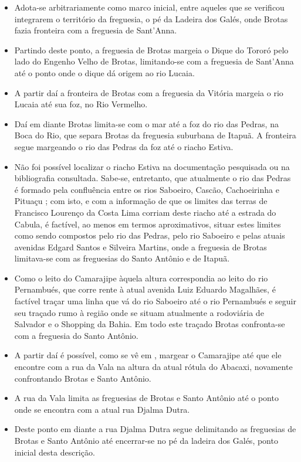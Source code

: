 \begin{itemize}
\item Adota-se arbitrariamente como marco inicial, entre aqueles que se verificou integrarem o território da freguesia, o pé da Ladeira dos Galés, onde Brotas fazia fronteira com a freguesia de Sant'Anna.
\item Partindo deste ponto, a freguesia de Brotas margeia o Dique do Tororó pelo lado do Engenho Velho de Brotas, limitando-se com a freguesia de Sant'Anna até o ponto onde o dique dá origem ao rio Lucaia.
\item A partir daí a fronteira de Brotas com a freguesia da Vitória margeia o rio Lucaia até sua foz, no Rio Vermelho.
\item Daí em diante Brotas limita-se com o mar até a foz do rio das Pedras, na Boca do Rio, que separa Brotas da freguesia suburbana de Itapuã. A fronteira segue margeando o rio das Pedras da foz até o riacho Estiva.
\item Não foi possível localizar o riacho Estiva na documentação pesquisada ou na bibliografia consultada. Sabe-se, entretanto, que atualmente o rio das Pedras é formado pela confluência entre os rios Saboeiro, Cascão, Cachoeirinha e Pituaçu \cite[p.~175]{santos_aguas_2010}; com isto, e com a informação de que os limites das terras de Francisco Lourenço da Costa Lima corriam deste riacho até a estrada do Cabula, é factível, ao menos em termos aproximativos, situar estes limites como sendo compostos pelo rio das Pedras, pelo rio Saboeiro e pelas atuais avenidas Edgard Santos e Silveira Martins, onde a freguesia de Brotas limitava-se com as freguesias do Santo Antônio e de Itapuã.
\item Como o leito do Camarajipe àquela altura correspondia ao leito do rio Pernambués, que corre rente à atual avenida Luiz Eduardo Magalhães, é factível traçar uma linha que vá do rio Saboeiro até o rio Pernambués e seguir seu traçado rumo à região onde se situam atualmente a rodoviária de Salvador e o Shopping da Bahia. Em todo este traçado Brotas confronta-se com a freguesia do Santo Antônio.
\item A partir daí é possível, como se vê em , margear o Camarajipe até que ele encontre com a rua da Vala na altura da atual rótula do Abacaxi, novamente confrontando Brotas e Santo Antônio.
\item A rua da Vala limita as freguesias de Brotas e Santo Antônio até o ponto onde se encontra com a atual rua Djalma Dutra.
\item Deste ponto em diante a rua Djalma Dutra segue delimitando as freguesias de Brotas e Santo Antônio até encerrar-se no pé da ladeira dos Galés, ponto inicial desta descrição.
\end{itemize}

